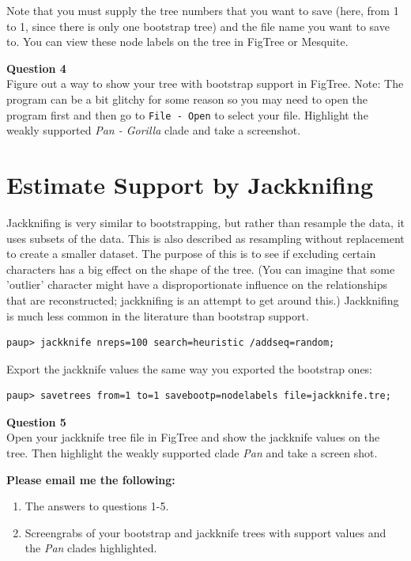 \documentclass[11pt]{article}
\begin{document}
Note that you must supply the tree numbers that you want to save (here, from 1 to 1, since there is only one bootstrap tree) and the file name you want to save to. You can view these node labels on the tree in FigTree or Mesquite.

\begin{framed}
\noindent
\textbf{Question 4} \\
Figure out a way to show your tree with bootstrap support in FigTree. 
Note: The program can be a bit glitchy for some reason so you may need to open the program first and 
then go to \texttt{File - Open} to select your file. 
Highlight the weakly supported \textit{Pan - Gorilla} clade and take a screenshot.
\end{framed}


\section{Estimate Support by Jackknifing}

Jackknifing is very similar to bootstrapping, but rather than resample the data, it uses subsets of the data. 
This is also described as resampling without replacement to create a smaller dataset. 
The purpose of this is to see if excluding certain characters has a big effect on the shape of the tree. 
(You can imagine that some 'outlier' character might have a disproportionate influence on the relationships that are reconstructed; 
jackknifing is an attempt to get around this.) 
Jackknifing is much less common in the literature than bootstrap support.

\begin{verbatim}
paup> jackknife nreps=100 search=heuristic /addseq=random;
\end{verbatim}

Export the jackknife values the same way you exported the bootstrap ones:

\begin{verbatim}
paup> savetrees from=1 to=1 savebootp=nodelabels file=jackknife.tre;
\end{verbatim}


\begin{framed}
\noindent
\textbf{Question 5} \\
Open your jackknife tree file in FigTree and show the jackknife values on the tree.
Then highlight the weakly supported clade \textit{Pan} and take a screen shot.
\end{framed}

\begin{framed}
\noindent
\textbf{Please email me the following:}
\begin{enumerate}
  \item The answers to questions 1-5.
  \item Screengrabs of your bootstrap and jackknife trees with support values and the \textit{Pan} clades highlighted.
\end{enumerate}
\end{framed}


 
\end{document}
